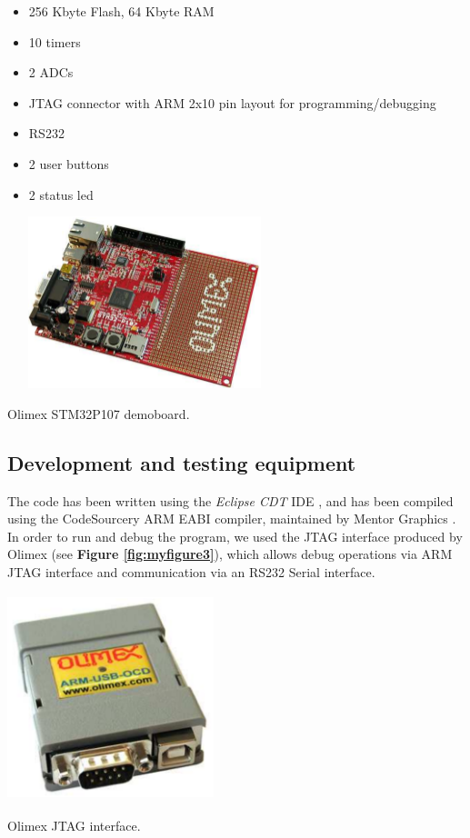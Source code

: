 \documentclass[a4paper,10pt]{article}
\makeatletter
\newenvironment{figurehere}{\def\@captype{figure}\vspace{2ex}}{\vspace{2ex}}
\makeatother
\begin{document}
\begin{multicols}{2}
\begin{itemize}
\item 256 Kbyte Flash, 64 Kbyte RAM
\item 10 timers
\item 2 ADCs
\item JTAG connector with ARM 2x10 pin layout for programming/debugging
\item RS232
\item 2 user buttons
\item 2 status led 
\end{itemize}

\begin{figurehere}
 \centering
 \includegraphics[width=8cm, height=5cm]{./eps/STM32P107}
 \caption{Olimex STM32P107 demoboard.}
 \label{fig:myfigure2}
\end{figurehere}

\subsection{Development and testing equipment}

The code has been written using the \textit{Eclipse CDT} IDE \cite{cdt}, and has been compiled using the CodeSourcery ARM EABI compiler, maintained by Mentor Graphics \cite{sourcery}.\\
In order to run and debug the program, we used the JTAG interface produced by Olimex (see {\bf Figure \ref{fig:myfigure3}}), which allows debug operations via ARM JTAG interface and communication via an RS232 Serial interface.

\begin{figurehere}
 \centering
 \includegraphics[width=6cm, height=6cm]{./eps/arm-usb-ocd}
 \caption{Olimex JTAG interface.}
 \label{fig:myfigure3}
\end{figurehere}


\end{multicols}
\end{document}
